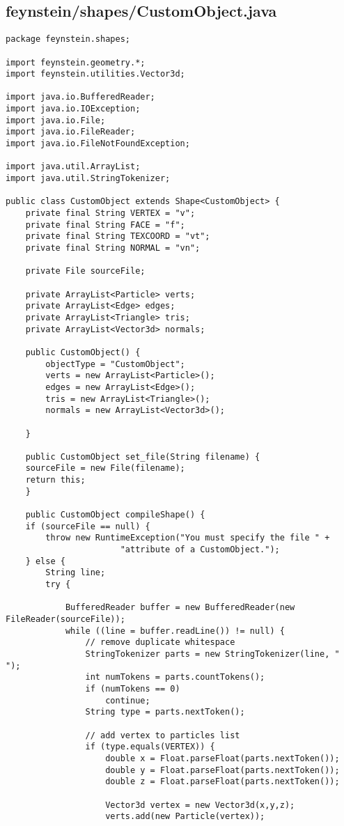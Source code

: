 \subsection*{feynstein/shapes/CustomObject.java}
\begin{lstlisting}
package feynstein.shapes;

import feynstein.geometry.*;
import feynstein.utilities.Vector3d;

import java.io.BufferedReader;
import java.io.IOException;
import java.io.File;
import java.io.FileReader;
import java.io.FileNotFoundException;

import java.util.ArrayList;
import java.util.StringTokenizer;

public class CustomObject extends Shape<CustomObject> {
	private final String VERTEX = "v";
	private final String FACE = "f";
	private final String TEXCOORD = "vt";
	private final String NORMAL = "vn";
	
	private File sourceFile;

	private ArrayList<Particle> verts;
	private ArrayList<Edge> edges;
	private ArrayList<Triangle> tris;
	private ArrayList<Vector3d> normals;

    public CustomObject() {
		objectType = "CustomObject";
		verts = new ArrayList<Particle>();
		edges = new ArrayList<Edge>();
		tris = new ArrayList<Triangle>();
		normals = new ArrayList<Vector3d>();
		
    }
    
    public CustomObject set_file(String filename) {
	sourceFile = new File(filename);
	return this;
    }

    public CustomObject compileShape() {
	if (sourceFile == null) {
	    throw new RuntimeException("You must specify the file " +
				       "attribute of a CustomObject.");
	} else {
		String line;
		try {
			
			BufferedReader buffer = new BufferedReader(new FileReader(sourceFile));
			while ((line = buffer.readLine()) != null) {
				// remove duplicate whitespace
				StringTokenizer parts = new StringTokenizer(line, " ");
				int numTokens = parts.countTokens();
				if (numTokens == 0)
					continue;
				String type = parts.nextToken();
				
				// add vertex to particles list
				if (type.equals(VERTEX)) {
					double x = Float.parseFloat(parts.nextToken());
					double y = Float.parseFloat(parts.nextToken());
					double z = Float.parseFloat(parts.nextToken());
					
					Vector3d vertex = new Vector3d(x,y,z);
					verts.add(new Particle(vertex));
					

\end{lstlisting}
